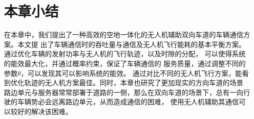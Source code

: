\section{本章小结}\label{section4-6}

在本章中，我们提出了一种高效的空地一体化的无人机辅助双向车道的车辆通信方案。本文提
出了车辆通信时的吞吐量与通信及无人机飞行能耗的基本平衡方案。通过优化车辆的发射功率与无人机的飞行轨迹，以及时隙的分配，
可以使得系统的能效最大化，并通过概率约束，保证了车辆通信的 服务质量，通过调整不同的参数$\theta$，可以发现其可以影响系统的能效。
通过对比不同的无人机飞行方案，能看到优化轨迹的无人机方案最佳。同时，本章也研究了更加现实的方向车道的场景
路边单元与服务器常常部署于道路的一侧，那么在双向车道的场景下，总有一向行驶的车辆势必会远离路边单元，从而造成通信的困难，
使用无人机辅助其通信可以较好的解决该困难。

